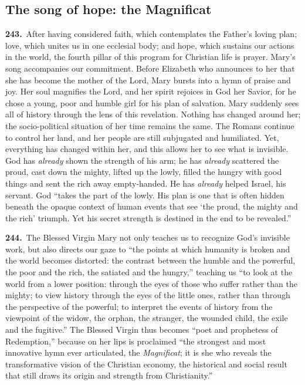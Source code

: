 \documentclass{article}
\begin{document}
\subsection{The song of hope: the Magnificat}

\textbf{243.}\ After having considered faith, which contemplates the Father's loving plan; love, which unites us in one ecclesial body; and hope, which sustains our actions in the world, the fourth pillar of this program for Christian life is prayer. Mary's song accompanies our commitment. Before Elizabeth who announces to her that she has become the mother of the Lord, Mary bursts into a hymn of praise and joy. Her soul magnifies the Lord, and her spirit rejoices in God her Savior, for he chose a young, poor and humble girl for his plan of salvation. Mary suddenly sees all of history through the lens of this revelation. Nothing has changed around her; the socio-political situation of her time remains the same. The Romans continue to control her land, and her people are still subjugated and humiliated. Yet, everything has changed within her, and this allows her to see what is invisible. God has \emph{already} shown the strength of his arm; he has \emph{already} scattered the proud, cast down the mighty, lifted up the lowly, filled the hungry with good things and sent the rich away empty-handed. He has \emph{already} helped Israel, his servant. God ``takes the part of the lowly. His plan is one that is often hidden beneath the opaque context of human events that see `the proud, the mighty and the rich' triumph. Yet his secret strength is destined in the end to be revealed.''\cite{n222}

\textbf{244.}\ The Blessed Virgin Mary not only teaches us to recognize God's invisible work, but also directs our gaze to ``the points at which humanity is broken and the world becomes distorted: the contrast between the humble and the powerful, the poor and the rich, the satiated and the hungry,'' teaching us ``to look at the world from a lower position: through the eyes of those who suffer rather than the mighty; to view history through the eyes of the little ones, rather than through the perspective of the powerful; to interpret the events of history from the viewpoint of the widow, the orphan, the stranger, the wounded child, the exile and the fugitive.''\cite{n223} The Blessed Virgin thus becomes ``poet and prophetess of Redemption,'' because on her lips is proclaimed ``the strongest and most innovative hymn ever articulated, the \emph{Magnificat}; it is she who reveals the transformative vision of the Christian economy, the historical and social result that still draws its origin and strength from Christianity.''\cite{n224}
\end{document}
